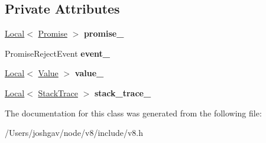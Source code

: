 \subsection*{Private Attributes}
\begin{DoxyCompactItemize}
\item 
\hyperlink{classv8_1_1_local}{Local}$<$ \hyperlink{classv8_1_1_promise}{Promise} $>$ {\bfseries promise\+\_\+}\hypertarget{classv8_1_1_promise_reject_message_a21a47d63f57740ac79e90a1f8d4de1a3}{}\label{classv8_1_1_promise_reject_message_a21a47d63f57740ac79e90a1f8d4de1a3}

\item 
Promise\+Reject\+Event {\bfseries event\+\_\+}\hypertarget{classv8_1_1_promise_reject_message_a40c18262bff9955b6accec1a6c069a58}{}\label{classv8_1_1_promise_reject_message_a40c18262bff9955b6accec1a6c069a58}

\item 
\hyperlink{classv8_1_1_local}{Local}$<$ \hyperlink{classv8_1_1_value}{Value} $>$ {\bfseries value\+\_\+}\hypertarget{classv8_1_1_promise_reject_message_a06067111ef1233d7c3b38fcc8a77d5a2}{}\label{classv8_1_1_promise_reject_message_a06067111ef1233d7c3b38fcc8a77d5a2}

\item 
\hyperlink{classv8_1_1_local}{Local}$<$ \hyperlink{classv8_1_1_stack_trace}{Stack\+Trace} $>$ {\bfseries stack\+\_\+trace\+\_\+}\hypertarget{classv8_1_1_promise_reject_message_a28e8114e1e9d7b9ed60a546a3fcf7ff7}{}\label{classv8_1_1_promise_reject_message_a28e8114e1e9d7b9ed60a546a3fcf7ff7}

\end{DoxyCompactItemize}


The documentation for this class was generated from the following file\+:\begin{DoxyCompactItemize}
\item 
/\+Users/joshgav/node/v8/include/v8.\+h\end{DoxyCompactItemize}
